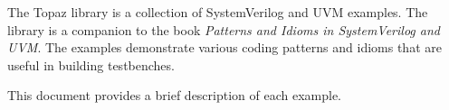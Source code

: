 The Topaz library is a collection of SystemVerilog and UVM examples.
The library is a companion to the book \emph{Patterns and Idioms in
SystemVerilog and UVM}.  The examples demonstrate various coding
patterns and idioms that are useful in building testbenches.

This document provides a brief description of each example.

